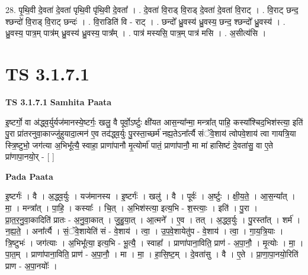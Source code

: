 \documentclass[17pt]{extarticle}
\begin{document}
28. पृ॒थि॒वी दे॒वता॑ दे॒वता॑ पृथि॒वी पृ॑थि॒वी दे॒वता᳚ । . दे॒वता॑ वि॒राड् वि॒राड् दे॒वता॑ दे॒वता॑ वि॒राट् । . वि॒राट् छन्द॒ श्छन्दो॑ वि॒राड् वि॒राट् छन्दः॑ । . वि॒राडिति॑ वि - राट् । . छन्दो᳚ ध्रु॒वस्य॑ ध्रु॒वस्य॒ छन्द॒ श्छन्दो᳚ ध्रु॒वस्य॑ । . ध्रु॒वस्य॒ पात्र॒म् पात्र॑म् ध्रु॒वस्य॑ ध्रु॒वस्य॒ पात्र᳚म् । . पात्र॑ मस्यसि॒ पात्र॒म् पात्र॑ मसि । . अ॒सीत्य॑सि । \newline
\pagebreak
{}

\section{ TS 3.1.7.1 }

\textbf{TS 3.1.7.1 } \newline
\textbf{Samhita Paata} \newline

इ॒ष्टर्गो॒ वा अ॑द्ध्व॒र्युर्यज॑मानस्ये॒ष्टर्गः॒ खलु॒ वै पूर्वो॒ऽर्ष्टुः क्षी॑यत आस॒न्या᳚न्मा॒ मन्त्रा᳚त् पाहि॒ कस्या᳚श्चिद॒भिश॑स्त्या॒ इति॑ पु॒रा प्रा॑तरनुवा॒काज्जु॑हुयादा॒त्मन॑ ए॒व तद॑द्ध्व॒र्युः पु॒रस्ता॒च्छर्म॑ नह्य॒तेऽना᳚र्त्यै संॅवे॒शाय॑ त्वोपवे॒शाय॑ त्वा गायत्रि॒या स्त्रि॒ष्टुभो॒ जग॑त्या अ॒भिभू᳚त्यै॒ स्वाहा॒ प्राणा॑पानौ मृ॒त्योर्मा॑ पातं॒ प्राणा॑पानौ॒ मा मा॑ हासिष्टं दे॒वता॑सु॒ वा ए॒ते प्रा॑णापा॒नयो॒र् - [  ] \newline

\textbf{Pada Paata} \newline

इ॒ष्टर्गः॑ । वै । अ॒द्ध्व॒र्युः । यज॑मानस्य । इ॒ष्टर्गः॑ । खलु॑ । वै । पूर्वः॑ । अ॒र्ष्टुः । क्षी॒य॒ते॒ । आ॒स॒न्या᳚त् । मा॒ । मन्त्रा᳚त् । पा॒हि॒ । कस्याः᳚ । चि॒त् । अ॒भिश॑स्त्या॒ इत्य॒भि - श॒स्त्याः॒ । इति॑ । पु॒रा । प्रा॒त॒र॒नु॒वा॒कादिति॑ प्रातः - अ॒नु॒वा॒कात् । जु॒हु॒या॒त् । आ॒त्मने᳚ । ए॒व । तत् । अ॒द्ध्व॒र्युः । पु॒रस्ता᳚त् । शर्म॑ । न॒ह्य॒ते॒ । अना᳚र्त्यै । सं॒ॅवे॒शायेति॑ सं - वे॒शाय॑ । त्वा॒ । उ॒प॒वे॒शायेतु॑प - वे॒शाय॑ । त्वा॒ । गा॒य॒त्रि॒याः । त्रि॒ष्टुभः॑ । जग॑त्याः । अ॒भिभू᳚त्या॒ इत्य॒भि - भू॒त्यै॒ । स्वाहा᳚ । प्राणा॑पाना॒विति॒ प्राण॑ - अ॒पा॒नौ॒ । मृ॒त्योः । मा॒ । पा॒त॒म् । प्राणा॑पाना॒विति॒ प्राण॑ - अ॒पा॒नौ॒ । मा । मा॒ । हा॒सि॒ष्ट॒म् । दे॒वता॑सु । वै । ए॒ते । प्रा॒णा॒पा॒नयो॒रिति॑ प्राण - अ॒पा॒नयोः᳚ ।  \newline
\end{document}
